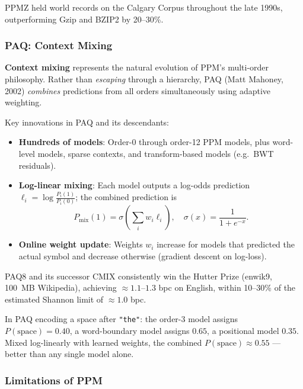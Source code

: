 PPMZ held world records on the Calgary Corpus throughout the late 1990s, outperforming
Gzip and BZIP2 by 20--30\%.

\subsubsection{PAQ: Context Mixing}

\begin{importantbox}
\textbf{Context mixing} represents the natural evolution of PPM's multi-order
philosophy. Rather than \emph{escaping} through a hierarchy, PAQ (Matt Mahoney,
2002) \emph{combines} predictions from all orders simultaneously using adaptive
weighting.
\end{importantbox}

Key innovations in PAQ and its descendants:
\begin{itemize}
    \item \textbf{Hundreds of models}: Order-0 through order-12 PPM models, plus
          word-level models, sparse contexts, and transform-based models
          (e.g.\ BWT residuals).
    \item \textbf{Log-linear mixing}: Each model outputs a log-odds prediction
          $\ell_i = \log \frac{P_i(1)}{P_i(0)}$; the combined prediction is
          \[
              P_{\text{mix}}(1) = \sigma\!\left(\sum_i w_i \ell_i\right),
              \quad \sigma(x) = \frac{1}{1+e^{-x}}.
          \]
    \item \textbf{Online weight update}: Weights $w_i$ increase for models that
          predicted the actual symbol and decrease otherwise (gradient descent on
          log-loss).
\end{itemize}

PAQ8 and its successor CMIX consistently win the Hutter Prize (enwik9, 100~MB
Wikipedia), achieving $\approx 1.1$--$1.3$ bpc on English, within 10--30\% of the
estimated Shannon limit of $\approx 1.0$ bpc.

\begin{examplebox}
In PAQ encoding a space after \texttt{"the"}: the order-3 model assigns
$P(\text{space}) = 0.40$, a word-boundary model assigns $0.65$, a positional model
$0.35$. Mixed log-linearly with learned weights, the combined
$P(\text{space}) \approx 0.55$ --- better than any single model alone.
\end{examplebox}

\subsubsection{Limitations of PPM}

